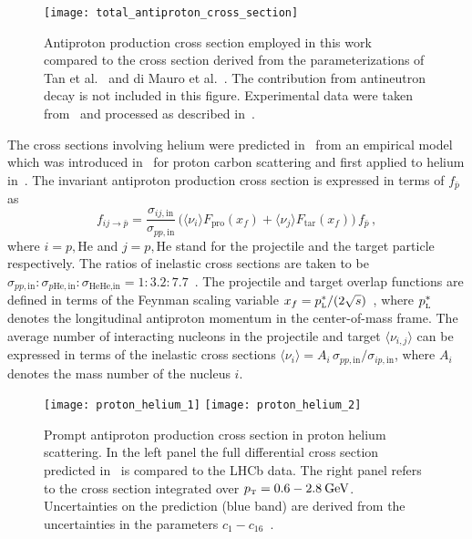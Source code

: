 \documentclass[a4paper,11pt]{article}
\newcommand{\eVdist}{\kern-0.06em}
\newcommand{\gev}{\:\text{Ge\eVdist V}}
\newcommand{\pl}{p_{\text{\tiny{L}}}}
\newcommand{\pt}{p_{\text{\tiny{T}}}}
\begin{document}
\begin{figure}[htp]
\begin{center}   
 \texttt{[image: total\_antiproton\_cross\_section]}
\end{center}
\caption{Antiproton production cross section employed in this work~\cite{Winkler:2017xor} compared to the cross section derived from the parameterizations of Tan et al.~\cite{Tan:1982nc} and di Mauro et al.~\cite{diMauro:2014zea}. The contribution from antineutron decay is not included in this figure. Experimental data were taken from~\cite{Antinucci:1972ib,Abelev:2008ab,Anticic:2009wd,Adare:2011vy,Aamodt:2011zj,Chatrchyan:2012qb} and processed as described in~\cite{Winkler:2017xor}.}
\label{fig:comparisonpbar}
\end{figure}

The cross sections involving helium were predicted in~\cite{Winkler:2017xor} from an empirical model which was introduced in~\cite{Baatar:2012fua} for proton carbon scattering and first applied to helium in~\cite{Kappl:2014hha}. The invariant antiproton production cross section is expressed in terms of $f_{\bar{p}}$ as
\begin{equation}\label{eq:helium}
f_{ij\rightarrow \bar{p}}   = \frac{\sigma_{ij,\text{in}}}{\sigma_{pp,\text{in}}}\,\Big(\langle \nu_i \rangle  F_\text{pro}(x_f)
+\langle \nu_j \rangle  F_\text{tar}(x_f)\Big)\,
f_{\bar{p}}\,,
\end{equation}
where $i=p,\text{He}$ and $j=p,\text{He}$ stand for the projectile and the target particle respectively. The ratios of inelastic cross sections are taken to be 
$\sigma_{pp,\text{in}}:\sigma_{p\text{He},\text{in}}:\sigma_{\text{He}\text{He},\text{in}}=1:3.2:7.7$~\cite{Kappl:2014hha}. The projectile and target overlap functions are defined in terms of the Feynman scaling variable $x_f=\pl^*/(2\sqrt{s})$~\cite{Baatar:2012fua}, where $\pl^*$ denotes the longitudinal antiproton momentum in the center-of-mass frame. The average number of interacting nucleons in the projectile and target $\langle \nu_{i,j} \rangle$ can be expressed in terms of the inelastic cross sections $\langle \nu_{i} \rangle = A_i\,\sigma_{pp,\text{in}}/\sigma_{i p,\text{in}}$, where $A_i$ denotes the mass number of the nucleus $i$.


\begin{figure}[htp]
\begin{center}   
 \texttt{[image: proton\_helium\_1]}
 \hspace{1mm}
 \texttt{[image: proton\_helium\_2]}
\end{center}
\caption{Prompt antiproton production cross section in proton helium scattering. In the left panel the full differential cross section predicted in~\cite{Winkler:2017xor} is compared to the LHCb data. The right panel refers to the cross section integrated over $\pt=0.6-2.8\gev$. Uncertainties on the prediction (blue band) are derived from the uncertainties in the parameters $c_{1}-c_{16}$~\cite{Winkler:2017xor}.}
\label{fig:comparisonlhcb}
\end{figure}
\end{document}
